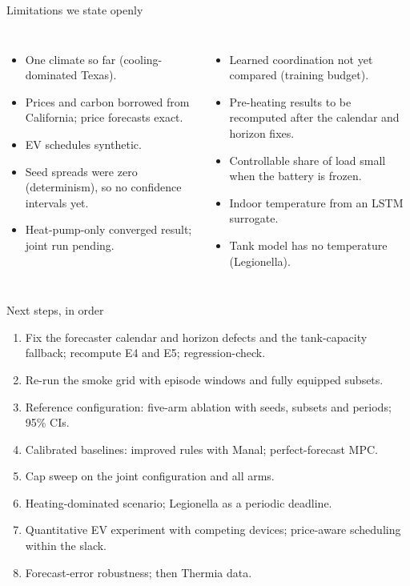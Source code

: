 \documentclass[aspectratio=169,10pt]{beamer}
\begin{document}
\begin{frame}{Limitations we state openly}
\begin{columns}[T]
\begin{itemize}
  \item One climate so far (cooling-dominated Texas).
  \item Prices and carbon borrowed from California; price forecasts exact.
  \item EV schedules synthetic.
  \item Seed spreads were zero (determinism), so no confidence intervals yet.
  \item Heat-pump-only converged result; joint run pending.
\end{itemize}
\begin{itemize}
  \item Learned coordination not yet compared (training budget).
  \item Pre-heating results to be recomputed after the calendar and horizon fixes.
  \item Controllable share of load small when the battery is frozen.
  \item Indoor temperature from an LSTM surrogate.
  \item Tank model has no temperature (Legionella).
\end{itemize}
\end{columns}
\end{frame}

\begin{frame}{Next steps, in order}
\begin{enumerate}
  \item Fix the forecaster calendar and horizon defects and the tank-capacity fallback; recompute E4 and E5; regression-check.
  \item Re-run the smoke grid with episode windows and fully equipped subsets.
  \item Reference configuration: five-arm ablation with seeds, subsets and periods; 95\% CIs.
  \item Calibrated baselines: improved rules with Manal; perfect-forecast MPC.
  \item Cap sweep on the joint configuration and all arms.
  \item Heating-dominated scenario; Legionella as a periodic deadline.
  \item Quantitative EV experiment with competing devices; price-aware scheduling within the slack.
  \item Forecast-error robustness; then Thermia data.
\end{enumerate}
\end{frame}
\end{document}
